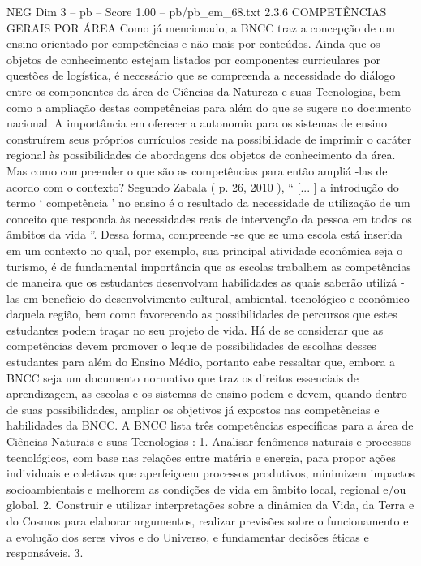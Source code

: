 \begin{textsample}{NEG Dim 3 – pb – Score 1.00 – pb/pb\_em\_68.txt}  \label{ex:f3_neg_207}
2.3.6 COMPETÊNCIAS GERAIS POR ÁREA Como já mencionado, a BNCC traz a concepção de um ensino orientado por competências e não mais por conteúdos.
Ainda que os objetos de conhecimento estejam listados por componentes curriculares por questões de logística, é necessário que se compreenda a necessidade do diálogo entre os componentes da área de Ciências da Natureza e suas Tecnologias, bem como a ampliação destas competências para além do que se sugere no documento nacional.
A importância em oferecer a autonomia para os sistemas de ensino construírem seus próprios currículos reside na possibilidade de imprimir o caráter regional às possibilidades de abordagens dos objetos de conhecimento da área.
Mas como compreender o que são as competências para então ampliá -las de acordo com o contexto?
Segundo Zabala ( p. 26, 2010 ), “ [... ] a introdução do termo ‘ competência ’ no ensino é o resultado da necessidade de utilização de um conceito que responda às necessidades reais de intervenção da pessoa em todos os âmbitos da vida ”.
Dessa forma, compreende -se que se uma escola está inserida em um contexto no qual, por exemplo, sua principal atividade econômica seja o turismo, é de fundamental importância que as escolas trabalhem as competências de maneira que os estudantes desenvolvam habilidades as quais saberão utilizá -las em benefício do desenvolvimento cultural, ambiental, tecnológico e econômico daquela região, bem como favorecendo as possibilidades de percursos que estes estudantes podem traçar no seu projeto de vida.
Há de se considerar que as competências devem promover o leque de possibilidades de escolhas desses estudantes para além do Ensino Médio, portanto cabe ressaltar que, embora a BNCC seja um documento normativo que traz os direitos essenciais de aprendizagem, as escolas e os sistemas de ensino podem e devem, quando dentro de suas possibilidades, ampliar os objetivos já expostos nas competências e habilidades da BNCC.
A BNCC lista três competências específicas para a área de Ciências Naturais e suas Tecnologias : 1.
Analisar fenômenos naturais e processos tecnológicos, com base nas relações entre matéria e energia, para propor ações individuais e coletivas que aperfeiçoem processos produtivos, minimizem impactos socioambientais e melhorem as condições de vida em âmbito local, regional e/ou global. 2.
Construir e utilizar interpretações sobre a dinâmica da Vida, da Terra e do Cosmos para elaborar argumentos, realizar previsões sobre o funcionamento e a evolução dos seres vivos e do Universo, e fundamentar decisões éticas e responsáveis. 3.

\end{textsample}
